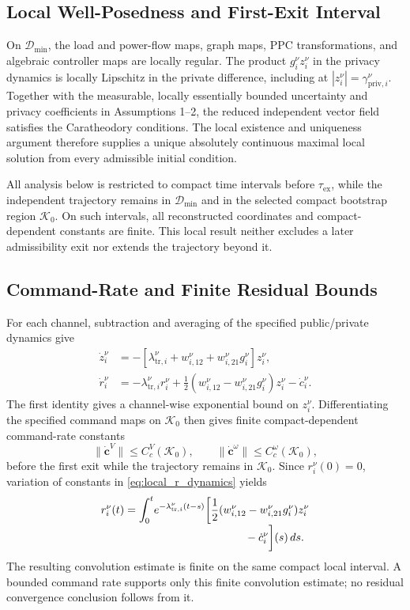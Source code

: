 \documentclass[journal]{IEEEtran}
\begin{document}
\subsection{Local Well-Posedness and First-Exit Interval}

On $\mathcal D_{\min}$, the load and power-flow maps, graph maps, PPC
transformations, and algebraic controller maps are locally regular. The product
$g_i^\nu z_i^\nu$ in the privacy dynamics is locally Lipschitz in the private
difference, including at $|z_i^\nu|=\gamma_{\mathrm{priv},i}^\nu$.
Together with the measurable, locally essentially bounded uncertainty and
privacy coefficients in Assumptions 1--2, the reduced independent vector field
satisfies the Caratheodory conditions. The local existence and uniqueness
argument therefore supplies a unique absolutely continuous maximal local
solution from every admissible initial condition.

All analysis below is restricted to compact time intervals before
$\tau_{\mathrm{ex}}$, while the independent trajectory remains in
$\mathcal D_{\min}$ and in the selected compact bootstrap region $\mathcal K_0$.
On such intervals, all
reconstructed coordinates and compact-dependent constants are finite. This
local result neither excludes a later admissibility exit nor extends the
trajectory beyond it.

\subsection{Command-Rate and Finite Residual Bounds}

For each channel, subtraction and averaging of the specified public/private
dynamics give
\begin{align}
\dot z_i^\nu
&=-[\lambda_{\mathrm{tr},i}^\nu+w_{i,12}^\nu
+w_{i,21}^\nu g_i^\nu]z_i^\nu,
\label{eq:local_z_dynamics}\\
\dot r_i^\nu
&=-\lambda_{\mathrm{tr},i}^\nu r_i^\nu
+\frac{1}{2}(w_{i,12}^\nu-w_{i,21}^\nu g_i^\nu)z_i^\nu
-\dot c_i^\nu.
\label{eq:local_r_dynamics}
\end{align}
The first identity gives a channel-wise exponential bound on $z_i^\nu$.
Differentiating the specified command maps on $\mathcal K_0$ then gives finite
compact-dependent command-rate constants
\begin{equation}
\|\dot{\bm c}^V\|\leq C_c^V(\mathcal K_0),
\qquad
\|\dot{\bm c}^\omega\|\leq C_c^\omega(\mathcal K_0),
\label{eq:local_command_rate_bounds}
\end{equation}
before the first exit while the trajectory remains in $\mathcal K_0$.
Since $r_i^\nu(0)=0$, variation of constants in
\eqref{eq:local_r_dynamics} yields
\begin{align}
r_i^\nu(t)=\int_0^t &e^{-\lambda_{\mathrm{tr},i}^\nu(t-s)}
\bigg[\frac{1}{2}(w_{i,12}^\nu-w_{i,21}^\nu g_i^\nu)z_i^\nu
\nonumber\\[-1mm]
&\hspace{29mm}-\dot c_i^\nu\bigg](s)\,ds.
\label{eq:local_residual_convolution}
\end{align}
The resulting convolution estimate is finite on the same compact local
interval. A bounded command rate supports only this finite convolution estimate;
no residual convergence conclusion follows from it.
\end{document}
